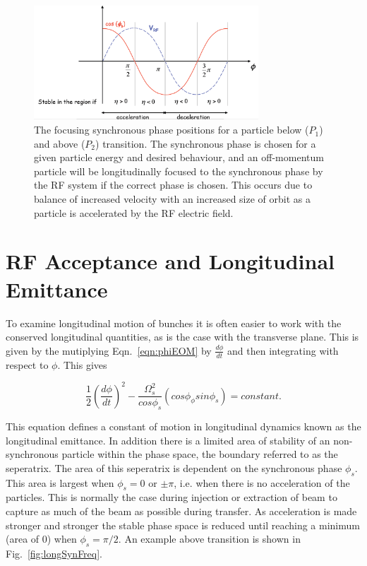 \begin{figure}
\begin{center}
\includegraphics[width=0.75\textwidth]{appendices/figures/longStab.png}
\end{center}
\caption{The focusing synchronous phase positions for a particle below ($P_{1}$) and above ($P_{2}$) transition. The synchronous phase is chosen for a given particle energy and desired behaviour, and an off-momentum particle will be longitudinally focused to the synchronous phase by the RF system if the correct phase is chosen. This occurs due to balance of increased velocity with an increased size of orbit as a particle is accelerated by the RF electric field.}
\label{fig:longPhase}
\end{figure}

\section{RF Acceptance and Longitudinal Emittance}

To examine longitudinal motion of bunches it is often easier to work with the conserved longitudinal quantities, as is the case with the transverse plane. This is given by the mutiplying Eqn.~\ref{eqn:phiEOM} by $\frac{d\phi}{dt}$ and then integrating with respect to $\phi$. This gives

\begin{equation}
\frac{1}{2}\left( \frac{d\phi}{dt} \right)^{2} - \frac{\Omega_{s}^{2}}{cos\phi_{s}} \left( cos\phi _ \phi sin\phi_{s} \right) = constant.
\end{equation} 

This equation defines a constant of motion in longitudinal dynamics known as the longitudinal emittance. In addition there is a limited area of stability of an non-synchronous particle within the phase space, the boundary referred to as the seperatrix. The area of this seperatrix is dependent on the synchronous phase $\phi_{s}$. This area is largest when $\phi_{s}=0$ or $\pm \pi$, i.e. when there is no acceleration of the particles. This is normally the case during injection or extraction of beam to capture as much of the beam as possible during transfer. As acceleration is made stronger and stronger the stable phase space is reduced until reaching a minimum (area of $0$) when $\phi_{s}=\pi /2$. An example above transition is shown in Fig.~\ref{fig:longSynFreq}.

